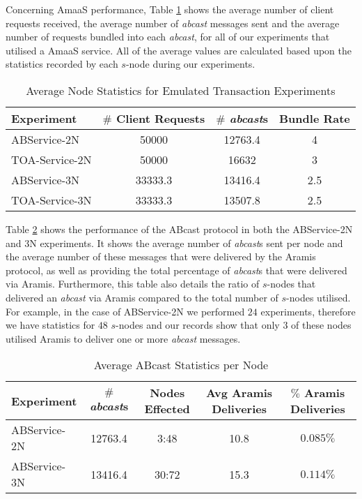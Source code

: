 	Concerning \textsf{AmaaS} performance, Table \ref{table:emulated_transaction_averages} shows the average number of client requests received, the average number of \emph{abcast} messages sent and the average number of requests bundled into each \emph{abcast}, for all of our experiments that utilised a \textsf{AmaaS} service.  All of the average values are calculated based upon the statistics recorded by each $s$-node during our experiments. 
	
    \begin{table}[h]
  \begin{center}
    \begin{tabular}{|l|c|c|c|}
    \hline
    Experiment & $\#$ Client Requests  & $\#$ \emph{abcast}s & Bundle Rate \\ \hline \hline
    ABService-2N     & 50000    &    12763.4    &    4 \\ \hline
    TOA-Service-2N  & 50000    &   16632    &   3 \\ \hline
    ABService-3N     & 33333.3 &    13416.4  &   2.5 \\ \hline
    TOA-Service-3N  & 33333.3 &    13507.8 & 2.5 \\ \hline
    \end{tabular}
    \caption{Average Node Statistics for Emulated Transaction Experiments}
    \label{table:emulated_transaction_averages}
  \end{center}
\end{table}	
	
    Table \ref{table:emulated_transcation_aramis_deliveries} shows the performance of the \textsf{ABcast} protocol in both the ABService-2N and 3N experiments.  It shows the average number of \emph{abcast}s sent per node and the average number of these messages that were delivered by the Aramis protocol, as well as providing the total percentage of \emph{abcast}s that were delivered via Aramis.  Furthermore, this table also details the ratio of $s$-nodes that delivered an \emph{abcast} via Aramis compared to the total number of $s$-nodes utilised.  For example, in the case of ABService-2N we performed $24$ experiments, therefore we have statistics for $48$ $s$-nodes and our records show that only $3$ of these nodes utilised Aramis to deliver one or more \emph{abcast} messages.  
	
	\begin{table}[h]
	  \begin{center}
	    \begin{tabular}{|l|c|c|c|c|}
	    \hline
	    Experiment  & $\#$ \emph{abcast}s & Nodes Effected &  Avg Aramis Deliveries & $\%$ Aramis Deliveries \\ \hline \hline
	    ABService-2N & 12763.4 & 3:48   & 10.8  & $0.085\%$  \\ \hline
	    ABService-3N & 13416.4 & 30:72 & 15.3  & $0.114\%$ \\ \hline
	    \end{tabular}
	    \caption{Average ABcast Statistics per Node}
	    \label{table:emulated_transcation_aramis_deliveries}
	  \end{center}
	\end{table}	
	
